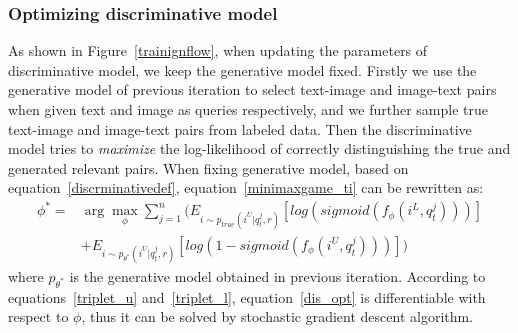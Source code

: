 \documentclass[journal]{IEEEtran}
\begin{document}
\subsubsection{Optimizing discriminative model}
As shown in Figure~\ref{trainignflow}, when updating the parameters of discriminative model, we keep the generative model fixed. Firstly we use the generative model of previous iteration to select text-image and image-text pairs when given text and image as queries respectively, and we further sample true text-image and image-text pairs from labeled data. Then the discriminative model tries to \textit{maximize} the log-likelihood of correctly distinguishing the true and generated relevant pairs. When fixing generative model, based on equation~\ref{discrminativedef}, equation~\ref{minimaxgame_ti} can be rewritten as:
\begin{equation}
\label{dis_opt}
\begin{split}
\phi^\ast=&\arg\max_{\phi}\sum_{j=1}^{n}(E_{i\sim p_{true}(i^U|q_t^j,r)}[log(sigmoid(f_\phi(i^L,q_t^j)))]\\
&+E_{i\sim p_{\theta^\ast}(i^U|q_t^j,r)}[log(1-sigmoid(f_\phi(i^U,q_t^j)))])
\end{split}
\end{equation}
where $p_{\theta^\ast}$ is the generative model obtained in previous iteration. According to equations~\ref{triplet_u} and~\ref{triplet_l}, equation~\ref{dis_opt} is differentiable with respect to $\phi$, thus it can be solved by stochastic gradient descent algorithm.
\end{document}
